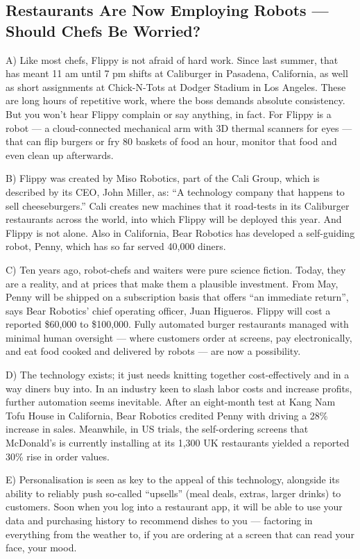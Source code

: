 \documentclass[UTF8,11pt]{ctexart}
\begin{document}
\subsection*{\textbf{Restaurants Are Now Employing Robots} — \textbf{Should Chefs Be Worried?}}


A) Like most chefs, Flippy is not afraid of hard work. Since last summer, that has meant 11 am until 7 pm shifts at Caliburger in Pasadena, California, as well as short assignments at Chick-N-Tots at Dodger Stadium in Los Angeles. These are long hours of repetitive work, where the boss demands absolute consistency. But you won’t hear Flippy complain or say anything, in fact. For Flippy is a robot — a cloud-connected mechanical arm with 3D thermal scanners for eyes — that can flip burgers or fry 80 baskets of food an hour, monitor that food and even clean up afterwards.


B) Flippy was created by Miso Robotics, part of the Cali Group, which is described by its CEO, John Miller, as: “A technology company that happens to sell cheeseburgers.” Cali creates new machines that it road-tests in its Caliburger restaurants across the world, into which Flippy will be deployed this year. And Flippy is not alone. Also in California, Bear Robotics has developed a self-guiding robot, Penny, which has so far served 40,000 diners.


C) Ten years ago, robot-chefs and waiters were pure science fiction. Today, they are a reality, and at prices that make them a plausible investment. From May, Penny will be shipped on a subscription basis that offers “an immediate return”, says Bear Robotics’ chief operating officer, Juan Higueros. Flippy will cost a reported \$60,000 to \$100,000. Fully automated burger restaurants managed with minimal human oversight — where customers order at screens, pay electronically, and eat food cooked and delivered by robots — are now a possibility.


D) The technology exists; it just needs knitting together cost-effectively and in a way diners buy into. In an industry keen to slash labor costs and increase profits, further automation seems inevitable. After an eight-month test at Kang Nam Tofu House in California, Bear Robotics credited Penny with driving a 28\% increase in sales. Meanwhile, in US trials, the self-ordering screens that McDonald’s is currently installing at its 1,300 UK restaurants yielded a reported 30\% rise in order values.


E) Personalisation is seen as key to the appeal of this technology, alongside its ability to reliably push so-called “upsells” (meal deals, extras, larger drinks) to customers. Soon when you log into a restaurant app, it will be able to use your data and purchasing history to recommend dishes to you — factoring in everything from the weather to, if you are ordering at a screen that can read your face, your mood.
\end{document}
